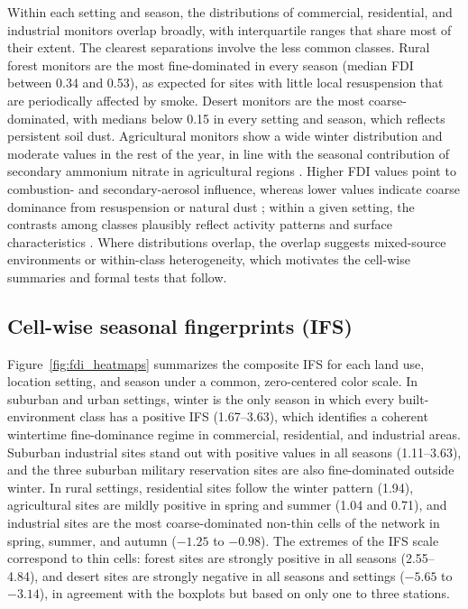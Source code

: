 \documentclass[a4paper,fleqn]{cas-sc}
\begin{document}
Within each setting and season, the distributions of commercial, residential, and industrial monitors overlap broadly, with interquartile ranges that share most of their extent. The clearest separations involve the less common classes. Rural forest monitors are the most fine-dominated in every season (median FDI between 0.34 and 0.53), as expected for sites with little local resuspension that are periodically affected by smoke. Desert monitors are the most coarse-dominated, with medians below 0.15 in every setting and season, which reflects persistent soil dust. Agricultural monitors show a wide winter distribution and moderate values in the rest of the year, in line with the seasonal contribution of secondary ammonium nitrate in agricultural regions \citep{Burns2023, Bell2007}. Higher FDI values point to combustion- and secondary-aerosol influence, whereas lower values indicate coarse dominance from resuspension or natural dust \citep{Liu2023, Xu2020}; within a given setting, the contrasts among classes plausibly reflect activity patterns and surface characteristics \citep{Wei2021, Clark2013}. Where distributions overlap, the overlap suggests mixed-source environments or within-class heterogeneity, which motivates the cell-wise summaries and formal tests that follow.

\subsection{Cell-wise seasonal fingerprints (IFS)}

Figure~\ref{fig:fdi_heatmaps} summarizes the composite IFS for each land use, location setting, and season under a common, zero-centered color scale. In suburban and urban settings, winter is the only season in which every built-environment class has a positive IFS (1.67--3.63), which identifies a coherent wintertime fine-dominance regime in commercial, residential, and industrial areas. Suburban industrial sites stand out with positive values in all seasons (1.11--3.63), and the three suburban military reservation sites are also fine-dominated outside winter. In rural settings, residential sites follow the winter pattern (1.94), agricultural sites are mildly positive in spring and summer (1.04 and 0.71), and industrial sites are the most coarse-dominated non-thin cells of the network in spring, summer, and autumn ($-1.25$ to $-0.98$). The extremes of the IFS scale correspond to thin cells: forest sites are strongly positive in all seasons (2.55--4.84), and desert sites are strongly negative in all seasons and settings ($-5.65$ to $-3.14$), in agreement with the boxplots but based on only one to three stations.
\end{document}
